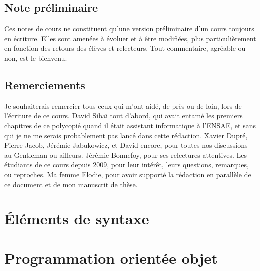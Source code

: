 \documentclass[a4paper]{book}
\begin{document}


\chapter{Note pr\'eliminaire}
Ces notes de cours ne constituent qu'une version pr\'eliminaire d'un cours toujours en \'ecriture. Elles sont amen\'ees \`a \'evoluer et \`a \^etre modifi\'ees,
plus particuli\`erement en fonction des retours des \'el\`eves et relecteurs. Tout commentaire, agr\'eable ou non, est le bienvenu.


\chapter*{Remerciements}
Je souhaiterais remercier tous ceux qui m'ont aid\'e, de pr\`es ou de loin, lors de l'\'ecriture de ce cours. David Siba\"{\i} tout d'abord, qui avait entam\'e les premiers chapitres de ce polycopi\'e quand il \'etait assistant informatique \`{a} l'ENSAE, et sans qui je ne me serais probablement pas lanc\'e dans cette r\'edaction. Xavier Dupr\'e, Pierre Jacob, J\'er\'emie Jabukowicz, et David encore, pour toutes nos discussions au Gentleman ou ailleurs. J\'er\'emie Bonnefoy, pour ses relectures attentives. Les \'etudiants de ce cours depuis 2009, pour leur int\'er\^{e}t, leurs questions, remarques, ou reproches. Ma femme Elodie, pour avoir support\'e la r\'edaction en parall\`{e}le de ce document et de mon manuscrit de th\`{e}se.

\begin{quote}

\end{quote}

\tableofcontents



\part{\'El\'ements de syntaxe}





%
\part{Programmation orient\'ee objet}





\end{document}
